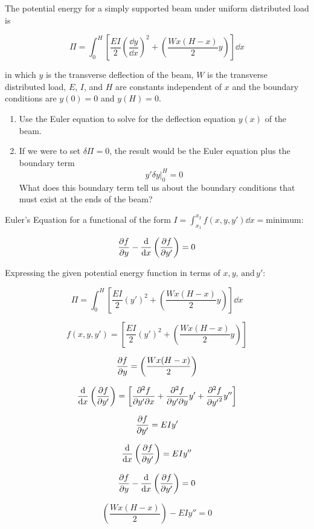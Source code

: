 \documentclass[../main.tex]{subfiles}
\begin{document}

The potential energy for a simply supported beam under uniform distributed load is

\[
    \Pi = \int_0^H \left[{\frac{EI}{2}\left({\frac{\dd y}{\dd x}}\right)^2 + \left({\frac{Wx(H-x)}{2}y}\right)}\right] \dd x
\]

in which \(y\) is the transverse deflection of the beam, \(W\) is the transverse distributed load, \(E\), \(I\), and \(H\) are constants independent of \(x\) %
and the boundary conditions are \(y(0) = 0\) and \(y(H)=0\).

\begin{enumerate}[label=\alph*)]
    \item Use the Euler equation to solve for the deflection equation \(y(x)\) of the beam.
    \item If we were to set \(\delta \Pi = 0\), the result would be the Euler equation plus the boundary term 
    \[
        \left.{y'\delta y}\right|_0^H = 0
    \]
    What does this boundary term tell us about the boundary conditions that must exist at the ends of the beam?
\end{enumerate}


\solution{}

Euler's Equation for a functional of the form \(I = \int_{x_1}^{x_2} f(x,y,y')\dd x = \textrm{minimum}\):

\[
    \pdv{f}{y} - \dv{x}\left({\pdv{f}{y'}}\right) = 0
\]

Expressing the given potential energy function in terms of \(x, y, \,\textrm{and}\,y'\):

\[
    \Pi = \int_0^H \left[{\frac{EI}{2}\left({y'}\right)^2 + \left({\frac{Wx(H-x)}{2}y}\right)}\right] \dd x
\]

\[
    f(x,y,y') = \left[{\frac{EI}{2}\left({y'}\right)^2 + \left({\frac{Wx(H-x)}{2}y}\right)}\right]
\]

\[
    \pdv{f}{y} = \left({\frac{Wx(H-x)}{2}}\right)
\]

\[
    \dv{x}\left({\pdv{f}{y'}}\right) = \left[{
    \pdv{f}{y'}{x} + \pdv{f}{y'}{y} y' + \pdv[2]{f}{{y'}} y''
    }\right]
\]

\[
    \pdv{f}{y'} = EIy'
\]

\[
    \dv{x}\left({\pdv{f}{y'}}\right) = %
    EIy''
\]

\[
    \pdv{f}{y} - \dv{x}\left({\pdv{f}{y'}}\right) = 0
\]

\[
    \left({\frac{Wx(H-x)}{2}}\right) - EIy'' = 0
\]
\end{document}
